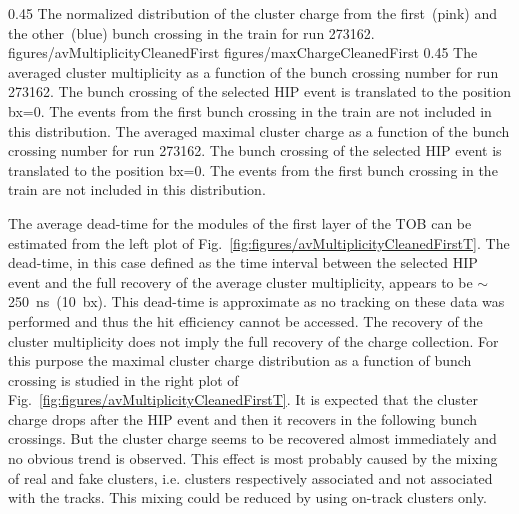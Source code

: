                  {0.45}       %
                 {The normalized distribution of the cluster charge from the first~(pink) and the other~(blue) bunch crossing in the train for run 273162.} 
                 {figures/avMultiplicityCleanedFirst} %
                 {figures/maxChargeCleanedFirst} %
                 {0.45}       %
                 {The averaged cluster multiplicity as a function of the bunch crossing number for run 273162. The bunch crossing of the selected HIP event is translated to the position bx=0. The events from the first bunch crossing in the train are not included in this distribution. The averaged maximal cluster charge as a function of the bunch crossing number for run 273162. The bunch crossing of the selected HIP event is translated to the position bx=0. The events from the first bunch crossing in the train are not included in this distribution. } %

The average dead-time for the modules of the first layer of the TOB can be estimated from the left plot of Fig.~\ref{fig:figures/avMultiplicityCleanedFirstT}. The dead-time, in this case defined as the time interval between the selected HIP event and the full recovery of the average cluster multiplicity, appears to be $\sim$250~ns~(10~bx). This dead-time is approximate as no tracking on these data was performed and thus the hit efficiency cannot be accessed. The recovery of the cluster multiplicity does not imply the full recovery of the charge collection. For this purpose the maximal cluster charge distribution as a function of bunch crossing is studied in the right plot of Fig.~\ref{fig:figures/avMultiplicityCleanedFirstT}. It is expected that the cluster charge drops after the HIP event and then it recovers in the following bunch crossings. But the cluster charge seems to be recovered almost immediately and no obvious trend is observed. This effect is most probably caused by the mixing of real and fake clusters, i.e. clusters respectively associated and not associated with the tracks. This mixing could be reduced by using on-track clusters only.

